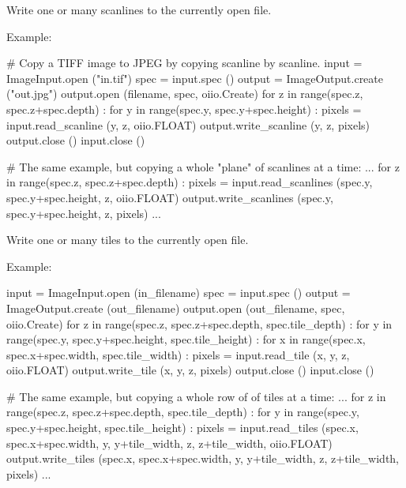 
Write one or many scanlines to the currently open file.

\noindent Example:
\begin{code}
    # Copy a TIFF image to JPEG by copying scanline by scanline.
    input = ImageInput.open ("in.tif")
    spec = input.spec ()
    output = ImageOutput.create ("out.jpg")
    output.open (filename, spec, oiio.Create)
    for z in range(spec.z, spec.z+spec.depth) :
        for y in range(spec.y, spec.y+spec.height) :
            pixels = input.read_scanline (y, z, oiio.FLOAT)
            output.write_scanline (y, z, pixels)
    output.close ()
    input.close ()

    # The same example, but copying a whole "plane" of scanlines at a time:
    ...
    for z in range(spec.z, spec.z+spec.depth) :
        pixels = input.read_scanlines (spec.y, spec.y+spec.height,
                                       z, oiio.FLOAT)
        output.write_scanlines (spec.y, spec.y+spec.height, z, pixels)
    ...
\end{code}
\apiend


Write one or many tiles to the currently open file.

\noindent Example:
\begin{code}
    input = ImageInput.open (in_filename)
    spec = input.spec ()
    output = ImageOutput.create (out_filename)
    output.open (out_filename, spec, oiio.Create)
    for z in range(spec.z, spec.z+spec.depth, spec.tile_depth) :
        for y in range(spec.y, spec.y+spec.height, spec.tile_height) :
            for x in range(spec.x, spec.x+spec.width, spec.tile_width) :
                pixels = input.read_tile (x, y, z, oiio.FLOAT)
                output.write_tile (x, y, z, pixels)
    output.close ()
    input.close ()

    # The same example, but copying a whole row of of tiles at a time:
    ...
    for z in range(spec.z, spec.z+spec.depth, spec.tile_depth) :
        for y in range(spec.y, spec.y+spec.height, spec.tile_height) :
            pixels = input.read_tiles (spec.x, spec.x+spec.width,
                                       y, y+tile_width,
                                       z, z+tile_width, oiio.FLOAT)
            output.write_tiles (spec.x, spec.x+spec.width,
                                y, y+tile_width, z, z+tile_width, pixels)
    ...
\end{code}
\apiend


